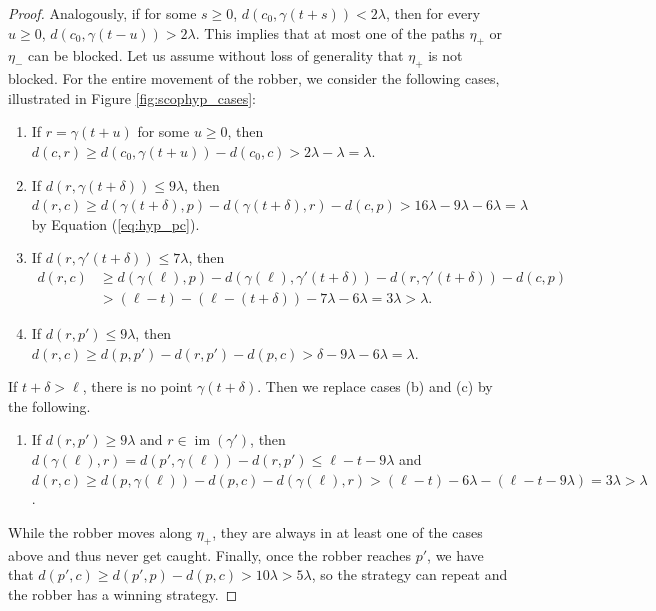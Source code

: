 \documentclass{amsart}
\newtheorem{corollary}[theorem]{Corollary}
\theoremstyle{definition}
\theoremstyle{remark}
\theoremstyle{remark}
\theoremstyle{definition}
\newcommand{\sCop}{\operatorname{sCop}}
\newcommand{\wCop}{\operatorname{wCop}}
\renewcommand{\leq}{\leqslant}
\renewcommand{\geq}{\geqslant}
\begin{document}
\begin{proof}
    Analogously, if for some $s\geq 0$, $d(c_0, \gamma(t+s))<2\lambda$, then for every $u \geq 0$, $d(c_0,\gamma(t-u))> 2\lambda$. This implies that at most one of the paths $\eta_+$ or $\eta_-$ can be blocked. Let us assume without loss of generality that $\eta_+$ is not blocked. For the entire movement of the robber, we consider the following cases, illustrated in Figure
    \ref{fig:scophyp_cases}:


    \begin{enumerate}
        \item[(a)] If $r = \gamma(t + u)$ for some $u\geq 0$, then $d(c,r) \geq d(c_0,\gamma(t+u)) - d(c_0,c) > 2\lambda - \lambda = \lambda$.
        \item[(b)] If $d(r,\gamma(t+\delta)) \leq 9\lambda$, then $d(r,c) \geq d(\gamma(t+\delta), p) - d(\gamma(t+\delta) , r) - d(c,p) > 16\lambda - 9\lambda -6\lambda = \lambda$ by Equation (\ref{eq:hyp_pc}). \label{eq:hyp-2ndcase}
        \item[(c)] If $d(r,\gamma'(t + \delta)) \leq 7\lambda$, then
    \begin{align*}
        d(r,c) &\geq d(\gamma(\ell),p) - d(\gamma(\ell),\gamma'(t+\delta)) - d(r,\gamma'(t + \delta)) - d(c,p) \\
        &> (\ell-t) - (\ell-(t+\delta)) - 7\lambda- 6\lambda = 3 \lambda > \lambda.
    \end{align*} \label{eq:hyp-3rdcase}
    \item[(d)]
    If $d(r,p') \leq 9 \lambda$, then $d(r,c) \geq d(p,p') - d(r,p') - d(p,c) > \delta - 9\lambda - 6 \lambda = \lambda$.
    \end{enumerate}
    If $t+\delta > \ell$, there is no point $\gamma(t+\delta)$. Then we replace cases (b) and (c) by the following.
      \begin{enumerate}
      \item[(e)] If $d(r,p')\geq 9\lambda$ and $r \in \operatorname{im}(\gamma')$, then $d(\gamma(\ell),r) = d(p',\gamma(\ell)) - d(r,p') \leq \ell - t - 9\lambda $ and $d(r,c) \geq d(p,\gamma(\ell)) - d(p,c) - d(\gamma(\ell), r) > (\ell - t) - 6\lambda - (\ell - t - 9\lambda) = 3\lambda > \lambda$.
      \end{enumerate}
		While the robber moves along $\eta_+$, they are always in at least one of the cases above and thus never get caught.  Finally, once the robber reaches $p'$, we have that $d(p',c) \geq d(p',p) - d(p,c) > 10 \lambda > 5\lambda$, so the strategy can repeat and the robber has a winning strategy.
\end{proof}
\end{document}
